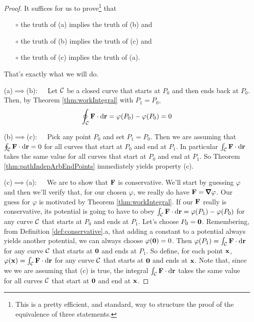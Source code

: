 \begin{proof}
It suffices for us to prove\footnote{This is a pretty efficient, and 
standard, way to structure the proof of the equivalence of three 
statements.} that 
\begin{itemize}\itemsep1pt \parskip0pt  %
\item[$\circ$]
the truth of (a) implies the truth of (b) and
\item[$\circ$]
the truth of (b) implies the truth of (c) and
\item[$\circ$]
the truth of (c) implies the truth of (a).
\end{itemize}
That's exactly what we will do.

\noindent (a)$\implies$(b):\ \ \ 
Let $\mathcal{C}$ be a closed curve that starts at $P_0$ and then ends back at $P_0$.
Then, by Theorem \ref{thm:workIntegral} with $P_1=P_0$,
\begin{equation*}
\oint_{\mathcal{C}}\mathbf{F}\cdot\mathrm{d}\mathbf{r} =\varphi(P_0) - \varphi(P_0)=0
\end{equation*}

\noindent (b)$\implies$(c):\ \ \ 
Pick any point $P_0$ and set $P_1=P_0$. Then we are assuming that
$\oint_{\mathcal{C}}\mathbf{F}\cdot\mathrm{d}\mathbf{r}=0$ for all curves that start at $P_0$ and end at $P_1$.
In particular  $\int_{\mathcal{C}}\mathbf{F}\cdot\mathrm{d}\mathbf{r}$ takes the same value for all curves
that start at $P_0$ and end at $P_1$.
So Theorem \ref{thm:pathIndepArbEndPoints} immediately yields
property (c).

\medskip
\noindent (c)$\implies$(a):\ \ \ We are to show that $\mathbf{F}$ is conservative.
We'll start by guessing $\varphi$ and then we'll verify that, for our
chosen $\varphi$, we really do have $\vF=\vnabla\varphi$. Our guess for 
$\varphi$ is motivated by Theorem \ref{thm:workIntegral}. If our $\mathbf{F}$ really is conservative, its potential is going to have to obey
$\int_{\mathcal{C}}\mathbf{F}\cdot\mathrm{d}\mathbf{r} =\varphi(P_1) - \varphi(P_0)$ for any curve $\mathcal{C}$ that starts at $P_0$ and ends at $P_1$. Let's choose $P_0=\mathbf{0}$. Remembering,
from Definition \ref{def:conservative}.a, that adding a constant to a 
potential always yields another potential, we can always choose 
$\varphi(\mathbf{0})=0$. Then $\varphi(P_1)=\int_{\mathcal{C}}\mathbf{F}\cdot\mathrm{d}\mathbf{r}$ for any 
curve $\mathcal{C}$ that starts at $\mathbf{0}$ and ends at $P_1$. So define,
for each point $\mathbf{x}$, $\varphi(\mathbf{x})=\int_{\mathcal{C}}\mathbf{F}\cdot\mathrm{d}\mathbf{r}$ for any 
curve $\mathcal{C}$ that starts at $\mathbf{0}$ and ends at $\mathbf{x}$. Note that, since we 
we are assuming that (c) is true, the integral $\int_{\mathcal{C}}\mathbf{F}\cdot\mathrm{d}\mathbf{r}$
takes the same value for all curves $\mathcal{C}$ that start at $\mathbf{0}$ and end at $\mathbf{x}$.


\end{proof}
